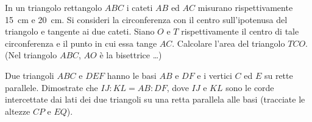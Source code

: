 \begin{multicols}{2}
% 
% 
\begin{esercizio}
\label{ese:6.89}
In un triangolo rettangolo \(ABC\) i cateti \(AB\) ed \(AC\) misurano 
rispettivamente 15~cm e 20~cm. Si consideri la circonferenza con il 
centro sull'ipotenusa del triangolo e tangente ai due cateti. Siano 
\(O\) e \(T\) rispettivamente il centro di tale circonferenza e il punto 
in cui essa tange \(AC\). Calcolare l'area del triangolo \(TCO\). (Nel 
triangolo \(ABC\), \(AO\) è la bisettrice \ldots)
\end{esercizio}


\end{multicols}

\noindent\begin{minipage}{.4\textwidth}
\begin{esercizio}
\label{ese:6.86}
Due triangoli \(ABC\) e \(DEF\) hanno le basi 
\(AB\) e \(DF\) e i vertici \(C\) ed \(E\) su rette parallele. Dimostrate che 
\(IJ:KL=AB:DF\), dove \(IJ\) e \(KL\) sono le corde intercettate dai lati 
dei due triangoli su una retta parallela alle basi (tracciate le 
altezze \(CP\) e \(EQ\)).
\end{esercizio}
\end{minipage}
\begin{minipage}{.6\textwidth}
\begin{inaccessibleblock}
 \begin{center}  \end{center}
\end{inaccessibleblock}
\end{minipage}

